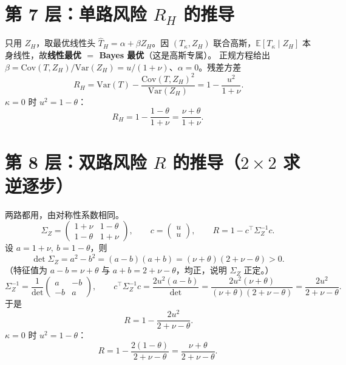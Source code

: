 \documentclass[UTF8,11pt,a4paper]{ctexart}
\newcommand{\E}{\mathbb{E}}
\newcommand{\Var}{\mathrm{Var}}
\newcommand{\Cov}{\mathrm{Cov}}
\begin{document}
\section{第 7 层：单路风险 $R_H$ 的推导}

只用 $Z_H$，取最优线性头 $\hat T_H=\alpha+\beta Z_H$。因 $(T_\kappa,Z_H)$ 联合高斯，$\E[T_\kappa\mid Z_H]$ 本身线性，故\textbf{线性最优 $=$ Bayes 最优}（这是高斯专属）。
正规方程给出 $\beta=\Cov(T,Z_H)/\Var(Z_H)=u/(1+\nu)$、$\alpha=0$。残差方差
\begin{equation}
\boxed{\,R_H=\Var(T)-\frac{\Cov(T,Z_H)^2}{\Var(Z_H)}=1-\frac{u^2}{1+\nu}.} \label{eq:RH}
\end{equation}
$\kappa=0$ 时 $u^2=1-\theta$：
\begin{equation}
R_H=1-\frac{1-\theta}{1+\nu}=\frac{\nu+\theta}{1+\nu}. \label{eq:RH0}
\end{equation}

\section{第 8 层：双路风险 $R$ 的推导（$2\times2$ 求逆逐步）}

两路都用，由对称性系数相同。
\[
\Sigma_Z=\begin{pmatrix}1+\nu & 1-\theta\\ 1-\theta & 1+\nu\end{pmatrix},\qquad c=\begin{pmatrix}u\\ u\end{pmatrix},\qquad
R=1-c^\top\Sigma_Z^{-1}c .
\]
设 $a=1+\nu,\ b=1-\theta$，则
\begin{equation}
\det\Sigma_Z=a^2-b^2=(a-b)(a+b)=(\nu+\theta)(2+\nu-\theta)>0 . \label{eq:det}
\end{equation}
（特征值为 $a-b=\nu+\theta$ 与 $a+b=2+\nu-\theta$，均正，说明 $\Sigma_Z$ 正定。）
\[
\Sigma_Z^{-1}=\frac{1}{\det}\begin{pmatrix}a&-b\\-b&a\end{pmatrix},\qquad
c^\top\Sigma_Z^{-1}c=\frac{2u^2(a-b)}{\det}=\frac{2u^2(\nu+\theta)}{(\nu+\theta)(2+\nu-\theta)}=\frac{2u^2}{2+\nu-\theta}.
\]
于是
\begin{equation}
\boxed{\,R=1-\frac{2u^2}{2+\nu-\theta}.} \label{eq:R}
\end{equation}
$\kappa=0$ 时 $u^2=1-\theta$：
\begin{equation}
R=1-\frac{2(1-\theta)}{2+\nu-\theta}=\frac{\nu+\theta}{2+\nu-\theta}. \label{eq:R0}
\end{equation}
\end{document}
